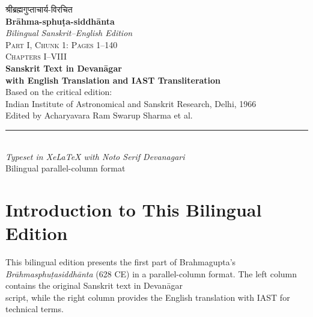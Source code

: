 \documentclass[11pt,a4paper]{article}
\newcommand{\longline}{\noindent\rule{\textwidth}{0.4pt}}
\begin{document}
\thispagestyle{empty}
\begin{center}
\vspace*{1.5cm}

{\devanagarifont\LARGE श्रीब्रह्मगुप्ताचार्य-विरचित}\\[1.2cm]

{\Huge\bfseries\color{titlecolor} Br\=ahma-sphu\d ta-siddh\=anta}\\[0.4cm]
{\Large\color{titlecolor}\textit{Bilingual Sanskrit--English Edition}}\\[1.5cm]

{\large\textsc{Part I, Chunk 1: Pages 1--140}}\\[0.5cm]
{\large\textsc{Chapters I--VIII}}\\[1.5cm]

{\large\textbf{Sanskrit Text in Devan\=agar\\[0.2cm]
with English Translation and IAST Transliteration}}\\[2cm]

{\large Based on the critical edition:}\\[0.2cm]
{\normalsize Indian Institute of Astronomical and Sanskrit Research, Delhi, 1966}\\[0.2cm]
{\small Edited by Acharyavara Ram Swarup Sharma et al.}\\[2cm]

\longline\\[0.5cm]
{\small\textit{Typeset in XeLaTeX with Noto Serif Devanagari}}\\
{\small Bilingual parallel-column format}

\vfill
\end{center}
\clearpage

\tableofcontents
\clearpage

\section*{Introduction to This Bilingual Edition}

This bilingual edition presents the first part of Brahmagupta's \textit{Br\=ahmasphu\d tasiddh\=anta} (628 CE) in a parallel-column format. The left column contains the original Sanskrit text in Devan\=agar\\ script, while the right column provides the English translation with IAST for technical terms.
\end{document}
